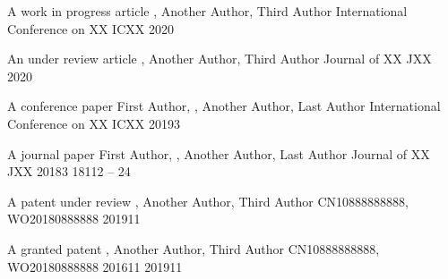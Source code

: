 

{A work in progress article} %
{, Another Author, Third Author}
{International Conference on XX} %
{ICXX} %
{2020} %

{An under review article}
{, Another Author, Third Author}
{Journal of XX} %
{JXX} %
{2020} %

{A conference paper}
{First Author, , Another Author, Last Author}
{International Conference on XX} %
{ICXX} %
{2019}{3} %

{A journal paper}
{First Author, , Another Author, Last Author}
{Journal of XX} %
{JXX} %
{2018}{3} %
{18}{1}{12 -- 24} %

{A patent under review}
{, Another Author, Third Author}
{CN10888888888, WO20180888888} %
{2019}{1}{1} %

{A granted patent}
{, Another Author, Third Author}
{CN10888888888, WO20180888888} %
{2016}{1}{1} %
{2019}{1}{1} %